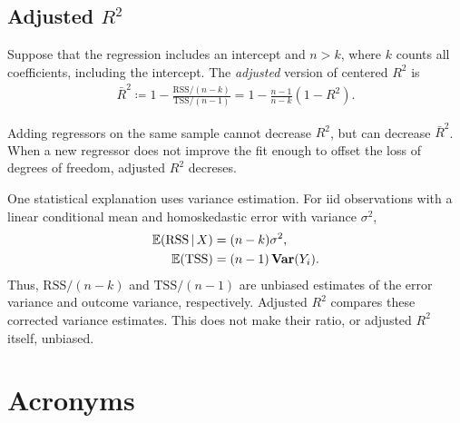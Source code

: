 \documentclass[a4paper,12pt]{article}
\begin{document}
\subsection{Adjusted \texorpdfstring{$R^2$}{R-squared}}

\begin{definition}
	Suppose that the regression includes an intercept and $n>k$,
	where $k$ counts all coefficients, including the intercept.
	The \emph{adjusted} version of centered $R^2$ is
	\begin{align}
		\bar R^2\coloneqq1-\frac{\mathrm{RSS}/(n-k)}{\mathrm{TSS}/(n-1)}
		=1-\frac{n-1}{n-k}(1-R^2).
	\end{align}
\end{definition}

\begin{remark}
	Adding regressors on the same sample cannot decrease $R^2$, but can decrease $\bar R^2$.
	When a new regressor does not improve the fit enough to offset the loss of degrees of freedom, adjusted $R^2$ decreses.
\end{remark}

\begin{remark}
	One statistical explanation uses variance estimation.
	For \gls{iid} observations with a linear conditional mean and homoskedastic error with variance $\sigma^2$,
	\begin{align*}
		\operatorname{\mathbb{E}}(\mathrm{RSS}\mathpunct{}|\mathpunct{} X)&=(n-k)\sigma^2,\\
		\operatorname{\mathbb{E}}(\mathrm{TSS})&=(n-1)\operatorname{\text{\textrm{\upshape\textbf{Var}}}}(Y_i).
	\end{align*}
	Thus, $\mathrm{RSS}/(n-k)$ and $\mathrm{TSS}/(n-1)$ are unbiased estimates of the error variance and outcome variance, respectively.
	Adjusted $R^2$ compares these corrected variance estimates.
	This does not make their ratio, or adjusted $R^2$ itself, unbiased.
\end{remark}

\vfill
\section*{Acronyms}
\printglossaries
\end{document}
